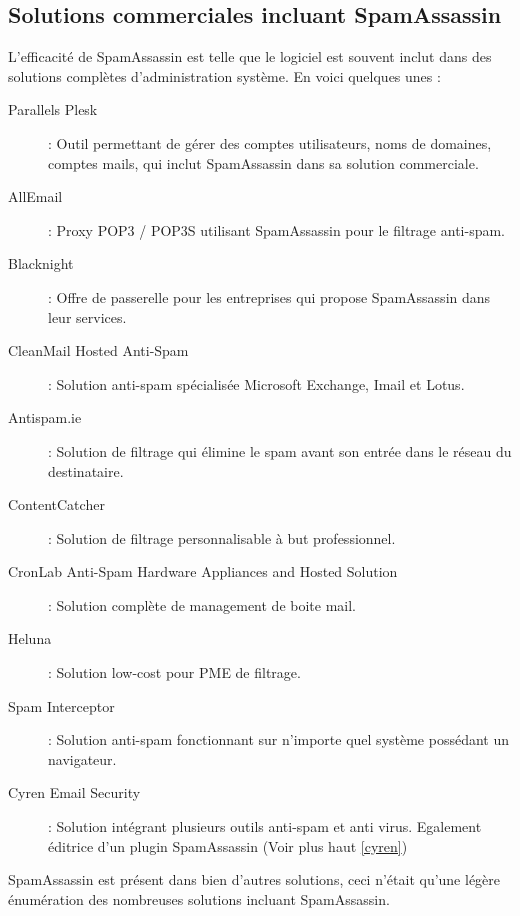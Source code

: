 \documentclass[a4paper,11pt]{article}
\begin{document}
\subsection{Solutions commerciales incluant SpamAssassin}
L'efficacité de SpamAssassin est telle que le logiciel est souvent inclut dans des solutions complètes d'administration système. En voici quelques unes : 
\begin{description}
\item [Parallels Plesk] : Outil permettant de gérer des comptes utilisateurs, noms de domaines, comptes mails, qui inclut SpamAssassin dans sa solution commerciale.
\item [AllEmail] : Proxy POP3 / POP3S utilisant SpamAssassin pour le filtrage anti-spam.
\item [Blacknight] : Offre de passerelle pour les entreprises qui propose SpamAssassin dans leur services.
\item [CleanMail Hosted Anti-Spam] : Solution anti-spam spécialisée Microsoft Exchange, Imail et Lotus.
\item [Antispam.ie] : Solution de filtrage qui élimine le spam avant son entrée dans le réseau du destinataire.
\item [ContentCatcher] : Solution de filtrage personnalisable à but professionnel.
\item [CronLab Anti-Spam Hardware Appliances and Hosted Solution] : Solution complète de management de boite mail.
\item [Heluna] : Solution low-cost pour PME de filtrage.
\item [Spam Interceptor] : Solution anti-spam fonctionnant sur n'importe quel système possédant un navigateur.
\item [Cyren Email Security]: Solution intégrant plusieurs outils anti-spam et anti virus. Egalement éditrice 
d'un plugin SpamAssassin (Voir plus haut \ref{cyren})
\end{description}

SpamAssassin est présent dans bien d'autres solutions, ceci n'était qu'une légère énumération des nombreuses solutions incluant SpamAssassin.
\end{document}
